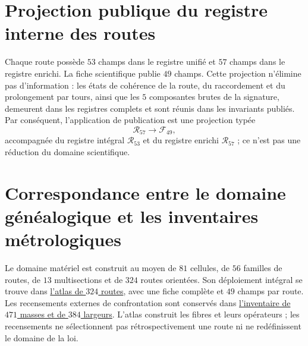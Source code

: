 \section{Projection publique du registre interne des routes}

Chaque route possède \(53\) champs dans le registre unifié et \(57\) champs dans le
registre enrichi. La fiche scientifique publie \(49\) champs. Cette
projection n'élimine pas d'information : les états de cohérence de la route,
du raccordement et du prolongement par tours, ainsi que les \(5\) composantes
brutes de la signature, demeurent dans les registres complets et sont réunis dans les
invariants publiés. Par conséquent, l'application de publication est une
projection typée
\[
  \mathcal R_{57}\longrightarrow\mathcal F_{49},
\]
accompagnée du registre intégral \(\mathcal R_{53}\) et du registre
enrichi \(\mathcal R_{57}\) ; ce n'est pas une réduction du domaine scientifique.

\section{Correspondance entre le domaine généalogique et les inventaires métrologiques}

Le domaine matériel est construit au moyen de \(81\) cellules, de \(56\) familles de
routes, de \(13\) multisections et de \(324\) routes orientées. Son déploiement intégral
se trouve dans
\hyperref[chap:atlas-genealogico-exhaustivo-324-rutas]{l'atlas de \(324\)
routes}, avec une fiche complète et \(49\) champs par route. Les recensements externes
de confrontation sont conservés dans
\hyperref[chap:inventario-universal-471-masas-384-anchuras]{l'inventaire de
\(471\) masses et de \(384\) largeurs}. L'atlas construit les fibres et leurs
opérateurs ; les recensements ne sélectionnent pas rétrospectivement une route ni ne
redéfinissent le domaine de la loi.
